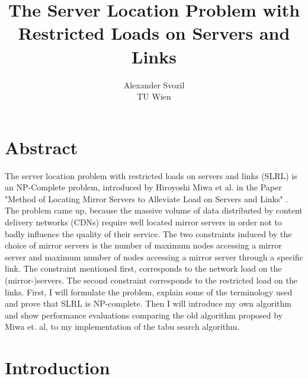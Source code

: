 \documentclass [12pt]{article}
\begin{document}
\author{Alexander Svozil\\ TU Wien}
\title{The Server Location Problem with Restricted Loads 
on Servers and Links}

\maketitle
\newpage

\section{Abstract}
The server location problem with restricted loads on servers and links (SLRL) is an NP-Complete
problem, introduced by Hiroyoshi Miwa et al. in the Paper "Method of Locating Mirror Servers
to Alleviate Load on Servers and Links" \cite{mirrorserver}. The problem 
came up, because the massive volume of data distributed by content delivery networks (CDNs) 
require well located mirror servers in order not to badly influence the quality of their service.
The two constraints induced by the choice of mirror servers is the number of maximum nodes
accessing a mirror server and maximum number of nodes accessing a mirror server 
through a specific link. The constraint mentioned first, corresponds to the network load on
the (mirror-)servers. The second constraint corresponds to the restricted load on the links.
First, I will formulate the problem, explain some of the terminology used and prove that SLRL is NP-complete.
Then I will introduce my own algorithm and show performance evaluations comparing the old algorithm proposed 
by Miwa et. al, to my implementation of the tabu search algorithm. 
\newpage
\tableofcontents
\newpage

\section{Introduction}
\end{document}
